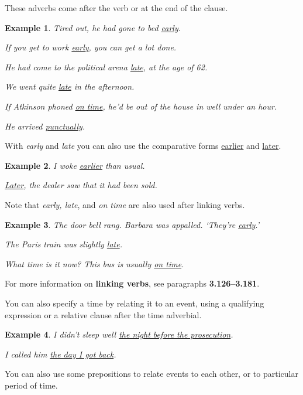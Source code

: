 \documentclass[oneside]{book}
\numberwithin{equation}{section}
\newtheorem{example}{Example}[section]
\begin{document}
%
These adverbs come after the verb or at the end of the clause.
\begin{example}
    Tired out, he had gone to bed \underline{early}.
    
    If you get to work \underline{early}, you can get a lot done.
    
    He had come to the political arena \underline{late}, at the age of 62.
    
    We went quite \underline{late} in the afternoon.
    
    If Atkinson phoned \underline{on time}, he'd be out of the house in well under an hour.
    
    He arrived \underline{punctually}.
\end{example}
With \textit{early} and \textit{late} you can also use the comparative forms \underline{earlier} and \underline{later}.
\begin{example}
    I woke \underline{earlier} than usual.
    
    \underline{Later}, the dealer saw that it had been sold.
\end{example}
Note that \textit{early, late}, and \textit{on time} are also used after linking verbs.
\begin{example}
    The door bell rang. Barbara was appalled. `They're \underline{early}.'
    
    The Paris train was slightly \underline{late}.
    
    What time is it now? This bus is usually \underline{on time}.
\end{example}
For more information on \textbf{linking verbs}, see paragraphs \textbf{3.126--3.181}.

%
\noindent{} You can also specify a time by relating it to an event, using a qualifying expression or a relative clause after the time adverbial.
\begin{example}
    I didn't sleep well \underline{the night before the prosecution}.
    
    I called him \underline{the day I got back}.
\end{example}
%
\noindent{} You can also use some prepositions to relate events to each other, or to particular period of time.
\end{document}
